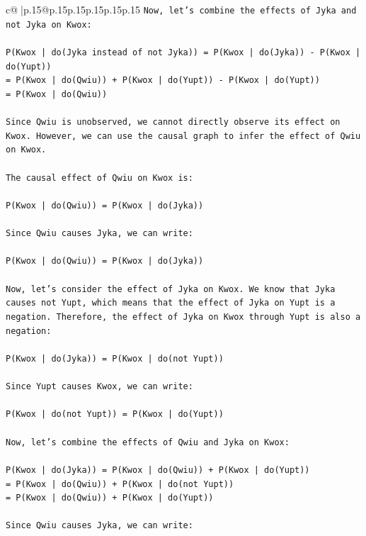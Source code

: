 \documentclass{article}
\begin{document}
{\begin{supertabular}{c@{$\;$}|p{.15\linewidth}@{}p{.15\linewidth}p{.15\linewidth}p{.15\linewidth}p{.15\linewidth}p{.15\linewidth}}
{{{\texttt{Now, let's combine the effects of Jyka and not Jyka on Kwox:} \\
\\ 
\texttt{P(Kwox | do(Jyka instead of not Jyka)) = P(Kwox | do(Jyka)) {-} P(Kwox | do(Yupt))} \\
\texttt{= P(Kwox | do(Qwiu)) + P(Kwox | do(Yupt)) {-} P(Kwox | do(Yupt))} \\
\texttt{= P(Kwox | do(Qwiu))} \\
\\ 
\texttt{Since Qwiu is unobserved, we cannot directly observe its effect on Kwox. However, we can use the causal graph to infer the effect of Qwiu on Kwox.} \\
\\ 
\texttt{The causal effect of Qwiu on Kwox is:} \\
\\ 
\texttt{P(Kwox | do(Qwiu)) = P(Kwox | do(Jyka))} \\
\\ 
\texttt{Since Qwiu causes Jyka, we can write:} \\
\\ 
\texttt{P(Kwox | do(Qwiu)) = P(Kwox | do(Jyka))} \\
\\ 
\texttt{Now, let's consider the effect of Jyka on Kwox. We know that Jyka causes not Yupt, which means that the effect of Jyka on Yupt is a negation. Therefore, the effect of Jyka on Kwox through Yupt is also a negation:} \\
\\ 
\texttt{P(Kwox | do(Jyka)) = P(Kwox | do(not Yupt))} \\
\\ 
\texttt{Since Yupt causes Kwox, we can write:} \\
\\ 
\texttt{P(Kwox | do(not Yupt)) = P(Kwox | do(Yupt))} \\
\\ 
\texttt{Now, let's combine the effects of Qwiu and Jyka on Kwox:} \\
\\ 
\texttt{P(Kwox | do(Jyka)) = P(Kwox | do(Qwiu)) + P(Kwox | do(Yupt))} \\
\texttt{= P(Kwox | do(Qwiu)) + P(Kwox | do(not Yupt))} \\
\texttt{= P(Kwox | do(Qwiu)) + P(Kwox | do(Yupt))} \\
\\ 
\texttt{Since Qwiu causes Jyka, we can write:} \\
}}}
\end{supertabular}}
\end{document}
